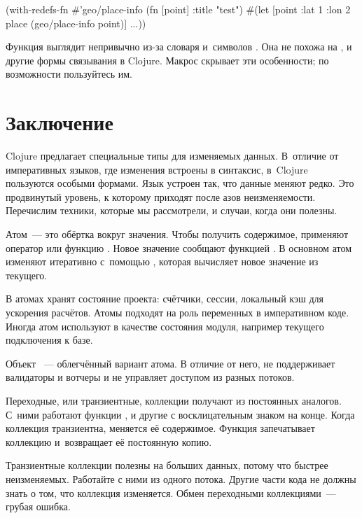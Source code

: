 \else

\begin{clojure}
(with-redefs-fn
  {#'geo/place-info (fn [point] {:title "test"})}
  #(let [point {:lat 1 :lon 2}
         place (geo/place-info point)]
     ...))
\end{clojure}

\fi

Функция  выглядит непривычно из-за словаря и~символов
. Она не похожа на ,  и другие формы
связывания в Clojure. Макрос  скрывает эти особенности; по
возможности пользуйтесь им.

\section{Заключение}

Clojure предлагает специальные типы для изменяемых данных. В~отличие от
императивных языков, где изменения встроены в синтаксис, в~Clojure пользуются
особыми формами. Язык устроен так, что данные меняют редко. Это продвинутый
уровень, к которому приходят после азов неизменяемости. Перечислим техники,
которые мы рассмотрели, и случаи, когда они полезны.

Атом~--- это обёртка вокруг значения. Чтобы получить содержимое, применяют
оператор  или функцию . Новое значение сообщают
функцией . В основном атом изменяют итеративно с~помощью
, которая вычисляет новое значение из текущего.

В атомах хранят состояние проекта: счётчики, сессии, локальный кэш для ускорения
расчётов. Атомы подходят на роль переменных в императивном коде. Иногда атом
используют в качестве состояния модуля, например текущего подключения к базе.

Объект ~--- облегчённый вариант атома. В отличие от него,
 не поддерживает валидаторы и вотчеры и не управляет доступом из
разных потоков.

Переходные, или транзиентные, коллекции получают из постоянных аналогов. С~ними
работают функции ,  и другие с восклицательным знаком
на конце.  Когда коллекция транзиентна, меняется её содержимое. Функция
 запечатывает коллекцию и~возвращает её постоянную копию.

Транзиентные коллекции полезны на больших данных, потому что быстрее
неизменяемых. Работайте с ними из одного потока. Другие части кода не должны
знать о том, что коллекция изменяется. Обмен переходными коллекциями~--- грубая
ошибка.

